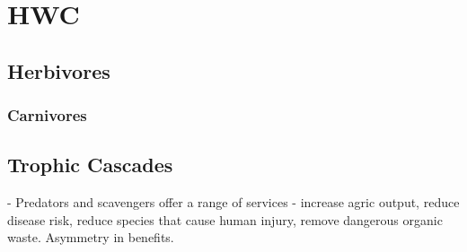 \section{HWC}

\subsection{Herbivores}

\subsubsection{Carnivores}

\subsection{Trophic Cascades}

\cite{O_Bryan_2018} - Predators and scavengers offer a range of services - increase agric output, reduce disease risk, reduce species that cause human injury, remove dangerous organic waste. Asymmetry in benefits.


